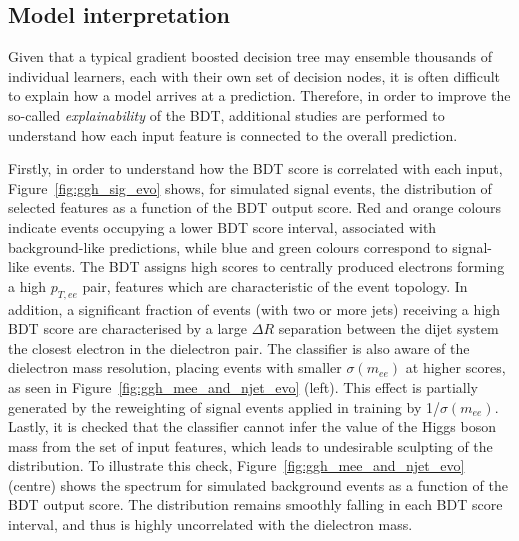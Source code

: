 \subsection{Model interpretation}

Given that a typical gradient boosted decision tree may ensemble thousands of individual learners, each with their own set of decision nodes, it is often difficult to explain how a model arrives at a prediction. Therefore, in order to improve the so-called \textit{explainability} of the \ggH BDT, additional studies are performed to understand how each input feature is connected to the overall prediction.

Firstly, in order to understand how the \ggH BDT score is correlated with each input, Figure~\ref{fig:ggh_sig_evo} shows, for simulated \ggH signal events, the distribution of selected features as a function of the BDT output score. Red and orange colours indicate events occupying a lower BDT score interval, associated with background-like predictions, while blue and green colours correspond to signal-like events.
The BDT assigns high scores to centrally produced electrons forming a high $p_{T,ee}$ pair, features which are characteristic of the \ggH event topology.
In addition, a significant fraction of events (with two or more jets) receiving a high BDT score are characterised by a large $\Delta R$ separation between the dijet system the closest electron in the dielectron pair.
The classifier is also aware of the dielectron mass resolution, placing events with 
smaller $\sigma(m_{ee})$ at higher scores, as seen in Figure~\ref{fig:ggh_mee_and_njet_evo} (left). This effect is partially generated by the reweighting of signal events applied in training by 1/$\sigma(m_{ee})$.
Lastly, it is checked that the classifier cannot infer the value of the Higgs boson mass from the set of input features, which leads to undesirable sculpting of the \mee distribution. To illustrate this check, Figure~\ref{fig:ggh_mee_and_njet_evo} (centre) shows the \mee spectrum for simulated background events as a function of the BDT output score. The distribution remains smoothly falling in each BDT score interval, and thus is highly uncorrelated with the dielectron mass.

